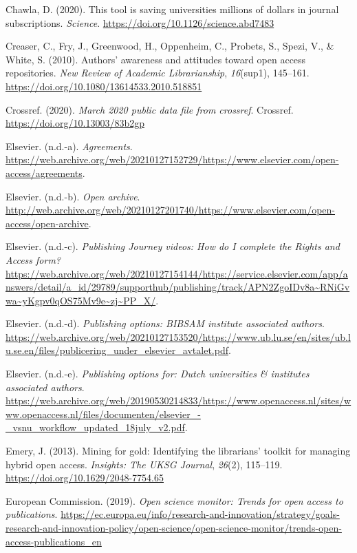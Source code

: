 \documentclass[a4paper,man,floatsintext,longtable,noextraspace,12pt]{apa6}
\newenvironment{CSLReferences}%
  {}%
  {\par}
\begin{document}
\begin{CSLReferences}{1}{0}
\leavevmode\hypertarget{ref-Chawla_2020}{}%
Chawla, D. (2020). This tool is saving universities millions of dollars
in journal subscriptions. \emph{Science}.
\url{https://doi.org/10.1126/science.abd7483}

\leavevmode\hypertarget{ref-Creaser_2010}{}%
Creaser, C., Fry, J., Greenwood, H., Oppenheim, C., Probets, S., Spezi,
V., \& White, S. (2010). Authors' awareness and attitudes toward open
access repositories. \emph{New Review of Academic Librarianship},
\emph{16}(sup1), 145--161.
\url{https://doi.org/10.1080/13614533.2010.518851}

\leavevmode\hypertarget{ref-Crossref_2020}{}%
Crossref. (2020). \emph{March 2020 public data file from crossref}.
Crossref. \url{https://doi.org/10.13003/83b2gp}

\leavevmode\hypertarget{ref-Els_Agreements}{}%
Elsevier. (n.d.-a). \emph{{Agreements}}.
\url{https://web.archive.org/web/20210127152729/https://www.elsevier.com/open-access/agreements}.

\leavevmode\hypertarget{ref-Els_Archive}{}%
Elsevier. (n.d.-b). \emph{{Open archive}}.
\url{http://web.archive.org/web/20210127201740/https://www.elsevier.com/open-access/open-archive}.

\leavevmode\hypertarget{ref-Els_videos}{}%
Elsevier. (n.d.-c). \emph{{Publishing Journey videos: How do I complete
the Rights and Access form?}}
\url{https://web.archive.org/web/20210127154144/https://service.elsevier.com/app/answers/detail/a_id/29789/supporthub/publishing/track/APN2ZgoIDv8a~RNiGvwa~yKgpv0qOS75Mv9e~zj~PP_X/}.

\leavevmode\hypertarget{ref-lund}{}%
Elsevier. (n.d.-d). \emph{{Publishing options: BIBSAM institute
associated authors}}.
\url{https://web.archive.org/web/20210127153520/https://www.ub.lu.se/en/sites/ub.lu.se.en/files/publicering_under_elsevier_avtalet.pdf}.

\leavevmode\hypertarget{ref-vsnu}{}%
Elsevier. (n.d.-e). \emph{{Publishing options for: Dutch universities \&
institutes associated authors}}.
\url{https://web.archive.org/web/20190530214833/https://www.openaccess.nl/sites/www.openaccess.nl/files/documenten/elsevier_-_vsnu_workflow_updated_18july_v2.pdf}.

\leavevmode\hypertarget{ref-Emery_2013}{}%
Emery, J. (2013). Mining for gold: Identifying the librarians' toolkit
for managing hybrid open access. \emph{Insights: The {UKSG} Journal},
\emph{26}(2), 115--119. \url{https://doi.org/10.1629/2048-7754.65}

\leavevmode\hypertarget{ref-OS_Monitor}{}%
European Commission. (2019). \emph{Open science monitor: Trends for open
access to publications}.
\url{https://ec.europa.eu/info/research-and-innovation/strategy/goals-research-and-innovation-policy/open-science/open-science-monitor/trends-open-access-publications_en}


\end{CSLReferences}
\end{document}
